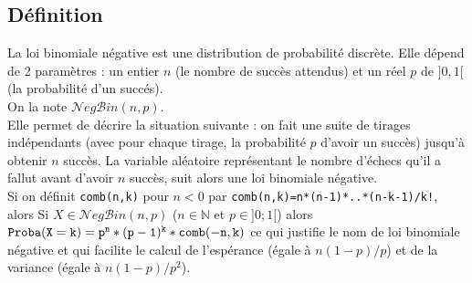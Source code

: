 \documentclass[a4paper,11pt]{book}
\newcommand{\N}{{\mathbb{N}}}
\begin{document}
\subsection{D\'efinition}
La loi binomiale n\'egative est une distribution de probabilit\'e 
discr\`ete. Elle d\'epend de 2 param\`etres : un entier $n$ (le nombre de 
succ\`es attendus) et un r\'eel $p$ de $]0,1[$ (la probabilité d'un succ\'es).\\
On la note  $\mathcal{N}eg\mathcal{B}in(n,p)$.\\  
Elle permet de d\'ecrire la situation suivante : on fait une suite de tirages 
ind\'ependants (avec pour chaque tirage, la probabilit\'e $p$ d'avoir un 
succ\`es) jusqu'\`a obtenir $n$ succ\`es.
La variable al\'eatoire représentant le nombre d'\'echecs qu'il a fallut avant 
d'avoir $n$ succ\`es, suit alors une loi binomiale n\'egative. \\
Si on d\'efinit {\tt comb(n,k)} pour $n<0$ par {\tt comb(n,k)=n*(n-1)*..*(n-k-1)/k!}, alors
Si $X \in \mathcal{N}eg\mathcal{B}in(n,p)$ ($n \in \N$ et $p \in ]0;1[$) alors
${\tt Proba(X=k)=p^n*(p-1)^k*comb(-n,k)}$
ce qui justifie le nom de loi binomiale n\'egative et qui facilite le calcul de
l'esp\'erance (\'egale \`a $n(1-p)/p$) et de la variance (\'egale \`a 
$n(1-p)/p^2$).\\
\end{document}
